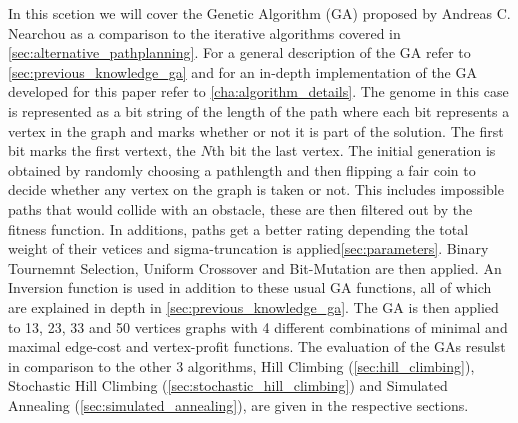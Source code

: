 In this scetion we will cover the Genetic Algorithm (GA) proposed by Andreas C. Nearchou \cite{8} as a comparison to the iterative algorithms covered in \ref{sec:alternative_pathplanning}. For a general description of the GA refer to \ref{sec:previous_knowledge_ga} and for an in-depth implementation of the GA developed for this paper refer to \ref{cha:algorithm_details}.
The genome in this case is represented as a bit string of the length of the path where each bit represents a vertex in the graph and marks whether or not it is part of the solution. The first bit marks the first vertext, the $N$th bit the last vertex. The initial generation is obtained by randomly choosing a pathlength and then flipping a fair coin to decide whether any vertex on the graph is taken or not. This includes impossible paths that would collide with an obstacle, these are then filtered out by the fitness function. In additions, paths get a better rating depending the total weight of their vetices and sigma-truncation is applied\ref{sec:parameters}. Binary Tournemnt Selection, Uniform Crossover and Bit-Mutation are then applied. An Inversion function is used in addition to these usual GA functions, all of which are explained in depth in \ref{sec:previous_knowledge_ga}.
The GA is then applied to 13, 23, 33 and 50 vertices graphs with 4 different combinations of minimal and maximal edge-cost and vertex-profit functions. The evaluation of the GAs resulst in comparison to the other 3 algorithms, Hill Climbing (\ref{sec:hill_climbing}), Stochastic Hill Climbing (\ref{sec:stochastic_hill_climbing}) and Simulated Annealing (\ref{sec:simulated_annealing}), are given in the respective sections.

